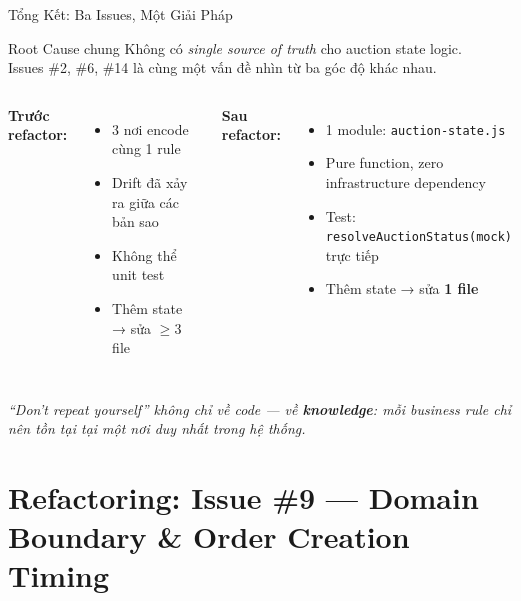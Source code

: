 \documentclass[12pt]{beamer}
\begin{document}
\begin{frame}{Tổng Kết: Ba Issues, Một Giải Pháp}
  \begin{block}{Root Cause chung}
    Không có \emph{single source of truth} cho auction state logic.\\
    Issues \#2, \#6, \#14 là cùng một vấn đề nhìn từ ba góc độ khác nhau.
  \end{block}

  \bigskip
  \begin{columns}[t]
    \textbf{Trước refactor:}
    \begin{itemize}
      \item 3 nơi encode cùng 1 rule
      \item Drift đã xảy ra giữa các bản sao
      \item Không thể unit test
      \item Thêm state → sửa $\geq 3$ file
    \end{itemize}

    \textbf{Sau refactor:}
    \begin{itemize}
      \item 1 module: \texttt{auction-state.js}
      \item Pure function, zero infrastructure dependency
      \item Test: \texttt{resolveAuctionStatus(mock)} trực tiếp
      \item Thêm state → sửa \textbf{1 file}
    \end{itemize}
  \end{columns}

  \bigskip
  \begin{center}
    \textit{``Don't repeat yourself'' không chỉ về code — về \textbf{knowledge}: mỗi business rule chỉ nên tồn tại tại một nơi duy nhất trong hệ thống.}
  \end{center}
\end{frame}

\section{Refactoring: Issue \#9 — Domain Boundary \& Order Creation Timing}
\end{document}
